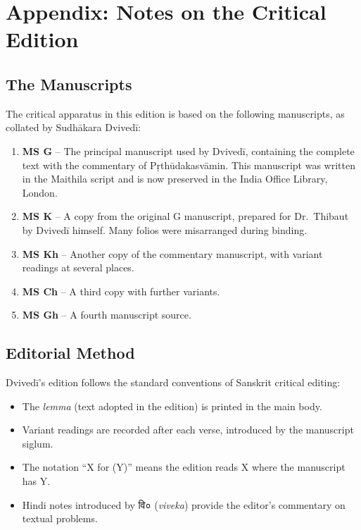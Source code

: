 \documentclass[11pt,a4paper]{article}
\newcommand{\dev}[1]{{\devanagarifont #1}}
\begin{document}
\section*{Appendix: Notes on the Critical Edition}

\subsection*{The Manuscripts}

The critical apparatus in this edition is based on the following manuscripts, 
as collated by Sudhākara Dvivedī:

\begin{enumerate}[label=\textbf{\arabic*.}]
  \item \textbf{MS G} -- The principal manuscript used by Dvivedī, containing the 
  complete text with the commentary of Pṛthūdakasvāmin. This manuscript was 
  written in the Maithila script and is now preserved in the India Office 
  Library, London.
  
  \item \textbf{MS K} -- A copy from the original G manuscript, prepared for 
  Dr.\ Thibaut by Dvivedī himself. Many folios were misarranged during binding.
  
  \item \textbf{MS Kh} -- Another copy of the commentary manuscript, with variant 
  readings at several places.
  
  \item \textbf{MS Ch} -- A third copy with further variants.
  
  \item \textbf{MS Gh} -- A fourth manuscript source.
\end{enumerate}

\subsection*{Editorial Method}

Dvivedī's edition follows the standard conventions of Sanskrit critical editing:

\begin{itemize}[label=\textbullet]
  \item The \textit{lemma} (text adopted in the edition) is printed in the main body.
  \item Variant readings are recorded after each verse, introduced by the 
  manuscript siglum.
  \item The notation ``X \dev{for} (Y)'' means the edition reads X where the 
  manuscript has Y.
  \item Hindi notes introduced by \dev{वि०} (\textit{viveka}) provide the editor's 
  commentary on textual problems.
\end{itemize}
\end{document}
